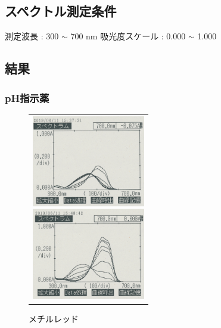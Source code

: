 \documentclass[a4paper,papersize,dvipdfmx]{jsarticle}
\begin{document}
\subsection*{スペクトル測定条件}
測定波長 : 300 $\sim$ 700 nm
吸光度スケール : 0.000 $\sim$ 1.000

\subsection*{結果}

\subsubsection*{pH指示薬}
\begin{figure}[H]
\begin{center}
\begin{tabular}{c}

\begin{minipage}{0.22\hsize}
\begin{center}
\includegraphics[clip, height=4cm]{imgs/MO.jpg}
\caption{メチルオレンジ}
\end{center}
\end{minipage}

\begin{minipage}{0.15\hsize}
\hspace{10mm}
\end{minipage}

\begin{minipage}{0.22\hsize}
\begin{center}
\includegraphics[clip, height=4cm]{imgs/MR.jpg}
\caption{メチルレッド}
\end{center}
\end{minipage}

\end{tabular}
\end{center}
\end{figure}
\end{document}
